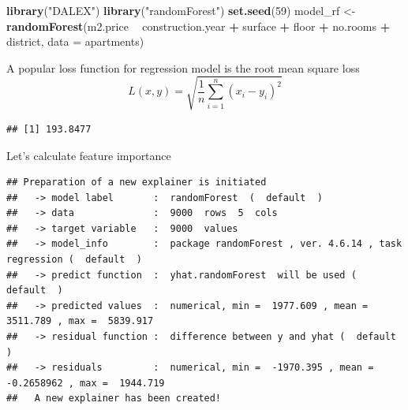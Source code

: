 \documentclass[12pt,]{krantz}
\newenvironment{Shaded}{\begin{snugshade}}{\end{snugshade}}
\newcommand{\DataTypeTok}[1]{\textcolor[rgb]{0.13,0.29,0.53}{#1}}
\newcommand{\DecValTok}[1]{\textcolor[rgb]{0.00,0.00,0.81}{#1}}
\newcommand{\KeywordTok}[1]{\textcolor[rgb]{0.13,0.29,0.53}{\textbf{#1}}}
\newcommand{\NormalTok}[1]{#1}
\newcommand{\OperatorTok}[1]{\textcolor[rgb]{0.81,0.36,0.00}{\textbf{#1}}}
\newcommand{\OtherTok}[1]{\textcolor[rgb]{0.56,0.35,0.01}{#1}}
\newcommand{\StringTok}[1]{\textcolor[rgb]{0.31,0.60,0.02}{#1}}
\begin{document}
\begin{Shaded}
\begin{Highlighting}[]
\KeywordTok{library}\NormalTok{(}\StringTok{"DALEX"}\NormalTok{)}
\KeywordTok{library}\NormalTok{(}\StringTok{"randomForest"}\NormalTok{)}
\KeywordTok{set.seed}\NormalTok{(}\DecValTok{59}\NormalTok{)}
\NormalTok{model_rf <-}\StringTok{ }\KeywordTok{randomForest}\NormalTok{(m2.price }\OperatorTok{~}\StringTok{ }\NormalTok{construction.year }\OperatorTok{+}\StringTok{ }\NormalTok{surface }\OperatorTok{+}\StringTok{ }\NormalTok{floor }\OperatorTok{+}\StringTok{ }
\StringTok{                           }\NormalTok{no.rooms }\OperatorTok{+}\StringTok{ }\NormalTok{district, }\DataTypeTok{data =}\NormalTok{ apartments)}
\end{Highlighting}
\end{Shaded}

A popular loss function for regression model is the root mean square loss
\[
  L(x, y) = \sqrt{\frac1n \sum_{i=1}^n (x_i - y_i)^2}
\]

\begin{Shaded}
\end{Shaded}

\begin{verbatim}
## [1] 193.8477
\end{verbatim}

Let's calculate feature importance

\begin{Shaded}
\end{Shaded}

\begin{verbatim}
## Preparation of a new explainer is initiated
##   -> model label       :  randomForest  (  default  )
##   -> data              :  9000  rows  5  cols 
##   -> target variable   :  9000  values 
##   -> model_info        :  package randomForest , ver. 4.6.14 , task regression (  default  ) 
##   -> predict function  :  yhat.randomForest  will be used (  default  )
##   -> predicted values  :  numerical, min =  1977.609 , mean =  3511.789 , max =  5839.917  
##   -> residual function :  difference between y and yhat (  default  )
##   -> residuals         :  numerical, min =  -1970.395 , mean =  -0.2658962 , max =  1944.719  
##   A new explainer has been created!
\end{verbatim}
\end{document}
